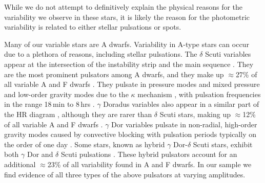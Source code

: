 \documentclass[twocolumn, linenumbers]{aastex631}
\begin{document}
While we do not attempt to definitively explain the physical reasons for the variability we observe in these stars, it is likely the reason for the photometric variability is related to either stellar pulsations or spots. 

Many of our variable stars are A dwarfs.  Variability in A-type stars can occur due to a plethora of reasons, including stellar pulsations.  The $\delta$ Scuti variables appear at the intersection of the instability strip and the main sequence \citep[e.g.,][]{Petit1987}.  They are the most prominent pulsators among A dwarfs, and they make up $\approx$27\% of all variable A and F dwarfs \citep{Uytterhoeven2011}. They pulsate in pressure modes and mixed pressure and low-order gravity modes due to the $\kappa$ mechanism \citep{Lee1985}, with pulsation frequencies in the range 18\,min to 8\,hrs \citep{Amado2004}. $\gamma$ Doradus variables also appear in a similar part of the HR diagram \citep[e.g.,][]{Kaye1999}, although they are rarer than $\delta$ Scuti stars, making up $\approx$12\% of all variable A and F dwarfs \citep{Uytterhoeven2011}. $\gamma$ Dor variables pulsate in non-radial, high-order gravity modes caused by convective blocking \citep{Guzik2000} with pulsation periods typically on the order of one day \citep{Grigahcene2010}.  Some stars, known as hybrid $\gamma$ Dor-$\delta$ Scuti stars, exhibit both $\gamma$ Dor and $\delta$ Scuti pulsations \citep{Grigahcene2010}.  These hybrid pulsators account for an additional $\approx$23\% of all variability found in A and F dwarfs. In our sample we find evidence of all three types of the above pulsators at varying amplitudes. 
\end{document}
